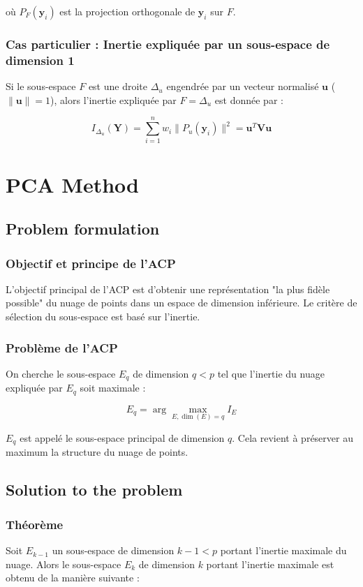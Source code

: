 \documentclass[10pt,a4paper]{article}
\begin{document}
où $P_F(\mathbf{y}_i)$ est la projection orthogonale de $\mathbf{y}_i$ sur $F$.

\subsubsection*{Cas particulier : Inertie expliquée par un sous-espace de dimension 1}
Si le sous-espace $F$ est une droite $\Delta_u$ engendrée par un vecteur normalisé $\mathbf{u}$ ($\|\mathbf{u}\| = 1$), alors l'inertie expliquée par $F = \Delta_u$ est donnée par :

\[
I_{\Delta_u}(\mathbf{Y}) = \sum_{i=1}^n w_i \|P_u(\mathbf{y}_i)\|^2 = \mathbf{u}^T \mathbf{V} \mathbf{u}
\]

\section*{PCA Method}

\subsection*{Problem formulation}
\subsubsection*{Objectif et principe de l'ACP}
L'objectif principal de l'ACP est d'obtenir une représentation "la plus fidèle possible" du nuage de points dans un espace de dimension inférieure. Le critère de sélection du sous-espace est basé sur l'inertie.

\subsubsection*{Problème de l'ACP}
On cherche le sous-espace $E_q$ de dimension $q < p$ tel que l'inertie du nuage expliquée par $E_q$ soit maximale :

\[
E_q = \arg \max_{E, \dim(E) = q} I_E
\]

$E_q$ est appelé le sous-espace principal de dimension $q$. Cela revient à préserver au maximum la structure du nuage de points.

\subsection*{Solution to the problem}
\subsubsection*{Théorème}
Soit $E_{k-1}$ un sous-espace de dimension $k-1 < p$ portant l'inertie maximale du nuage. Alors le sous-espace $E_k$ de dimension $k$ portant l'inertie maximale est obtenu de la manière suivante :
\end{document}
